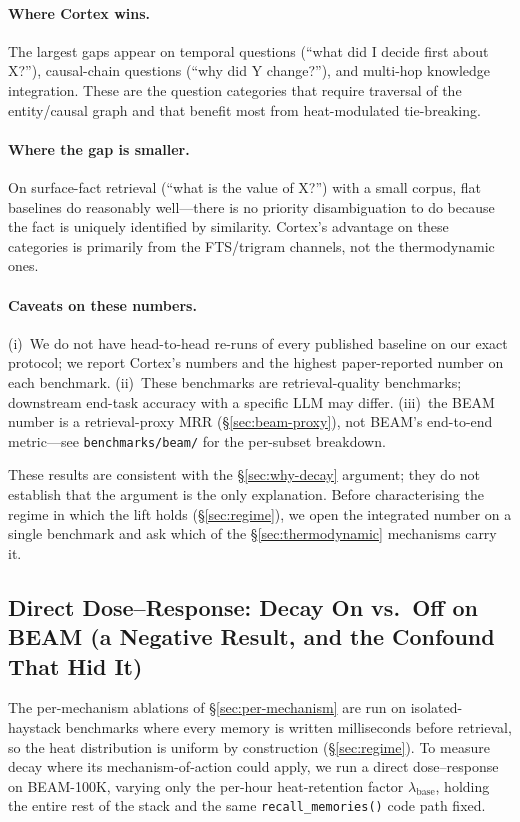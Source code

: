 \documentclass[11pt]{article}
\begin{document}
\paragraph{Where Cortex wins.}
The largest gaps appear on temporal questions (``what did I decide
first about X?''), causal-chain questions (``why did Y change?''),
and multi-hop knowledge integration.  These are the question
categories that require traversal of the entity/causal graph and
that benefit most from heat-modulated tie-breaking.

\paragraph{Where the gap is smaller.}
On surface-fact retrieval (``what is the value of X?'') with a
small corpus, flat baselines do reasonably well---there is no
priority disambiguation to do because the fact is uniquely
identified by similarity.  Cortex's advantage on these categories
is primarily from the FTS/trigram channels, not the thermodynamic
ones.

\paragraph{Caveats on these numbers.}
(i)~We do not have head-to-head re-runs of every published baseline
on our exact protocol; we report Cortex's numbers and the highest
paper-reported number on each benchmark.
(ii)~These benchmarks are retrieval-quality benchmarks; downstream
end-task accuracy with a specific LLM may differ.
(iii)~the BEAM number is a retrieval-proxy MRR
(\S\ref{sec:beam-proxy}), not BEAM's end-to-end metric---see
\texttt{benchmarks/beam/} for the per-subset breakdown.

These results are consistent with the \S\ref{sec:why-decay}
argument; they do not establish that the argument is the only
explanation.  Before characterising the regime in which the lift
holds (\S\ref{sec:regime}), we open the integrated number on a
single benchmark and ask which of the \S\ref{sec:thermodynamic} mechanisms
carry it.

\subsection{Direct Dose--Response: Decay On vs.\ Off on BEAM
(a Negative Result, and the Confound That Hid It)}
\label{sec:decay-dose}

The per-mechanism ablations of \S\ref{sec:per-mechanism} are run on
isolated-haystack benchmarks where every memory is written
milliseconds before retrieval, so the heat distribution is uniform
by construction (\S\ref{sec:regime}).  To measure decay where its
mechanism-of-action could apply, we run a direct dose--response on
BEAM-100K, varying only the per-hour heat-retention factor
$\lambda_{\mathrm{base}}$, holding the entire rest of the stack and
the same \texttt{recall\_memories()} code path fixed.
\end{document}
